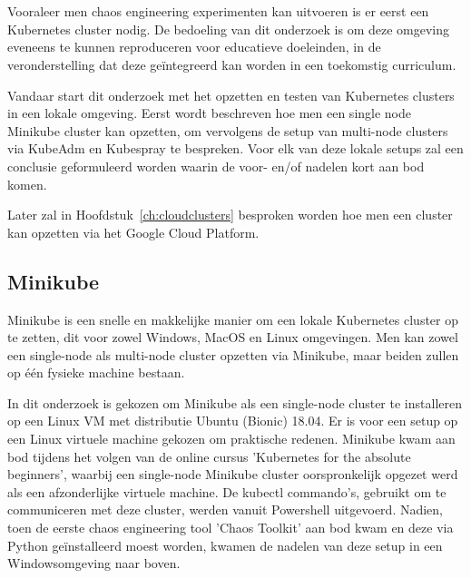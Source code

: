 
\chapter{}
\label{ch:lokaleclusters}

Vooraleer men chaos engineering experimenten kan uitvoeren is er eerst een Kubernetes cluster nodig. De bedoeling van dit onderzoek is om deze omgeving eveneens te kunnen reproduceren voor educatieve doeleinden, in de veronderstelling dat deze geïntegreerd kan worden in een toekomstig curriculum.

Vandaar start dit onderzoek met het opzetten en testen van Kubernetes clusters in een lokale omgeving. Eerst wordt beschreven hoe men een single node Minikube cluster kan opzetten, om vervolgens de setup van multi-node clusters via KubeAdm en Kubespray te bespreken. Voor elk van deze lokale setups zal een conclusie geformuleerd worden waarin de voor- en/of nadelen kort aan bod komen.  

Later zal in Hoofdstuk~\ref{ch:cloudclusters} besproken worden hoe men een cluster kan opzetten via het Google Cloud Platform. 

\section{Minikube}

Minikube is een snelle en makkelijke manier om een lokale Kubernetes cluster op te zetten, dit voor zowel Windows, MacOS en Linux omgevingen.  \autocite{Minikube2022} Men kan zowel een single-node als multi-node cluster opzetten via Minikube, maar beiden zullen op één fysieke machine bestaan.

In dit onderzoek is gekozen om Minikube als een single-node cluster te installeren op een Linux VM met distributie Ubuntu (Bionic) 18.04. Er is voor een setup op een Linux virtuele machine gekozen om praktische redenen. Minikube kwam aan bod tijdens het volgen van de online cursus 'Kubernetes for the absolute beginners', waarbij een single-node Minikube cluster oorspronkelijk opgezet werd als een afzonderlijke virtuele machine. De kubectl commando's, gebruikt om te communiceren met deze cluster, werden vanuit Powershell uitgevoerd. Nadien, toen de eerste chaos engineering tool 'Chaos Toolkit' aan bod kwam en deze via Python geïnstalleerd moest worden, kwamen de nadelen van deze setup in een Windowsomgeving naar boven.

